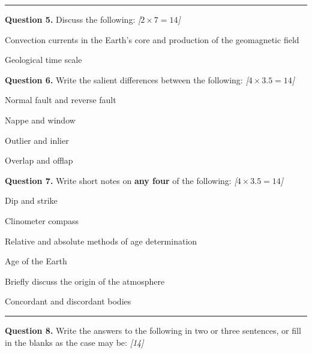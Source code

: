 \documentclass[11pt,a4paper]{article}
\newcommand{\pts}[1]{\hfill   \textit{[#1]}}
\begin{document}
\bigskip


\rule{\linewidth}{0.4pt}\smallskip




\noindent   \textbf{Question 5.} Discuss the following: \pts{$2  \times 7 = 14$}

\begin{parts}
  \item Convection currents in the Earth's core and production of the geomagnetic field
  \item Geological time scale
\end{parts}

\medskip


\noindent   \textbf{Question 6.} Write the salient differences between the following: \pts{$4  \times 3.5 = 14$}

\begin{parts}
  \item Normal fault and reverse fault
  \item Nappe and window
  \item Outlier and inlier
  \item Overlap and offlap
\end{parts}

\medskip


\noindent   \textbf{Question 7.} Write short notes on   \textbf{any four} of the following: \pts{$4  \times 3.5 = 14$}

\begin{parts}
  \item Dip and strike
  \item Clinometer compass
  \item Relative and absolute methods of age determination
  \item Age of the Earth
  \item Briefly discuss the origin of the atmosphere
  \item Concordant and discordant bodies
\end{parts}

\bigskip


\rule{\linewidth}{0.4pt}\smallskip




\noindent   \textbf{Question 8.} Write the answers to the following in two or three sentences, or fill in the blanks as the case may be: \pts{14}
\end{document}

